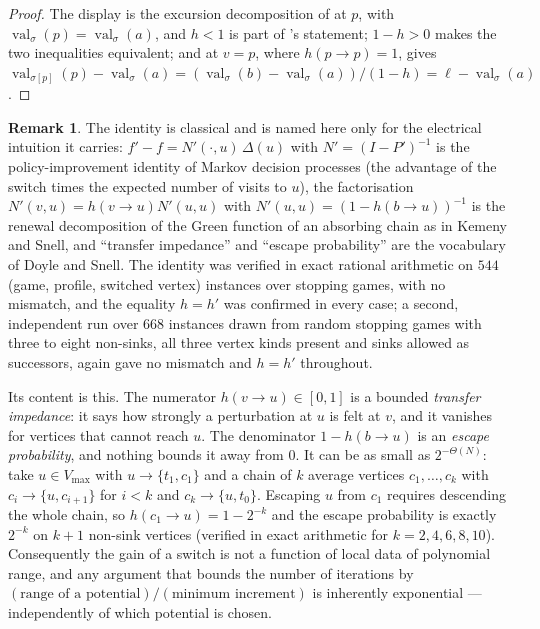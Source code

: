 \documentclass[11pt]{article}
\theoremstyle{plain}
\theoremstyle{definition}
\newtheorem{remark}[theorem]{Remark}
\DeclareMathOperator{\val}{val}
\newcommand{\Vmax}{V_{\max}}
\begin{document}
\begin{proof}
The display is the excursion decomposition of  at
$p$, with $\val_\sigma(p)=\val_\sigma(a)$, and $h<1$ is part of
's statement; $1-h>0$ makes the two inequalities
equivalent; and  at $v=p$, where $h(p\to p)=1$, gives
$\val_{\sigma[p]}(p)-\val_\sigma(a)=(\val_\sigma(b)-\val_\sigma(a))/(1-h)=\ell-\val_\sigma(a)$.
\end{proof}


\begin{remark}\label{rem:impedance}
The identity is classical and is named here only for the electrical
intuition it carries: $f'-f=N'(\cdot,u)\,\Delta(u)$ with
$N'=(I-P')^{-1}$ is the policy-improvement identity of Markov decision
processes (the advantage of the switch times the expected number of visits
to $u$), the factorisation $N'(v,u)=h(v\to u)N'(u,u)$ with
$N'(u,u)=(1-h(b\to u))^{-1}$ is the renewal decomposition of the Green
function of an absorbing chain as in Kemeny and Snell, and ``transfer
impedance'' and ``escape probability'' are the vocabulary of Doyle and
Snell. The identity was verified in exact rational arithmetic on $544$
(game, profile, switched vertex) instances over stopping games, with no
mismatch, and the equality $h=h'$ was confirmed in every case; a second,
independent run over $668$ instances drawn from random stopping games with
three to eight non-sinks, all three vertex kinds present and sinks allowed
as successors, again gave no mismatch and $h=h'$ throughout.

Its content is this. The numerator $h(v\to u)\in[0,1]$ is a bounded
\emph{transfer impedance}: it says how strongly a perturbation at $u$ is
felt at $v$, and it vanishes for vertices that cannot reach $u$. The
denominator $1-h(b\to u)$ is an \emph{escape probability}, and nothing
bounds it away from $0$. It can be as small as $2^{-\Theta(N)}$: take
$u\in\Vmax$ with $u\to\{t_1,c_1\}$ and a chain of $k$ average vertices
$c_1,\dots,c_k$ with $c_i\to\{u,c_{i+1}\}$ for $i<k$ and
$c_k\to\{u,t_0\}$. Escaping $u$ from $c_1$ requires descending the whole
chain, so $h(c_1\to u)=1-2^{-k}$ and the escape probability is exactly
$2^{-k}$ on $k+1$ non-sink vertices (verified in exact arithmetic for
$k=2,4,6,8,10$). Consequently the gain of a switch is not a function of
local data of polynomial range, and any argument that bounds the number of
iterations by
$(\text{range of a potential})/(\text{minimum increment})$ is
inherently exponential --- independently of which potential is chosen.


\end{remark}
\end{document}

